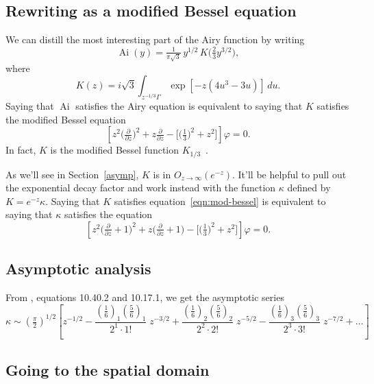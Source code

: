 \documentclass{article}
\DeclareMathOperator{\Ai}{Ai}
\begin{document}
\subsection{Rewriting as a modified Bessel equation}
We can distill the most interesting part of the Airy function by writing
\[ \Ai(y) = \tfrac{1}{\pi\sqrt{3}}\,y^{1/2}\, K\big(\tfrac{2}{3} y^{3/2}\big), \]
where
\begin{equation}\label{integral:mod-bessel}
K(z) = i\sqrt{3} \int_{z^{-1/3}\Gamma} \exp\left[-z \left(4u^3 - 3u\right)\right]\,du.
\end{equation}
Saying that $\Ai$ satisfies the Airy equation is equivalent to saying that $K$ satisfies the modified Bessel equation
\begin{equation}\label{eqn:mod-bessel}
\left[z^2 \big(\tfrac{\partial}{\partial z}\big)^2 + z \tfrac{\partial}{\partial z} - \big[\big(\tfrac{1}{3}\big)^2 + z^2\big]\right] \varphi = 0.
\end{equation}
In fact, $K$ is the modified Bessel function $K_{1/3}$~\cite[equation~9.6.1]{dlmf}.

As we'll see in Section~\ref{asymp}, $K$ is in $O_{z \to \infty}(e^{-z})$. It'll be helpful to pull out the exponential decay factor and work instead with the function $\kappa$ defined by $K = e^{-z} \kappa$. Saying that $K$ satisfies equation~\ref{eqn:mod-bessel} is equivalent to saying that $\kappa$ satisfies the equation
\begin{equation}\label{eqn:shifted-mod-bessel}
\left[z^2 \big(\tfrac{\partial}{\partial z} + 1\big)^2 + z \big(\tfrac{\partial}{\partial z} + 1\big) - \big[\big(\tfrac{1}{3}\big)^2 + z^2\big]\right] \varphi = 0.
\end{equation}
\subsection{Asymptotic analysis}
From \cite{dlmf}, equations 10.40.2 and 10.17.1, we get the asymptotic series
\begin{equation}\label{bessel-asymp}
\kappa \sim \left(\tfrac{\pi}{2}\right)^{1/2} \left[ z^{-1/2} - \frac{(\tfrac{1}{6})_1 (\tfrac{5}{6})_1}{2^1 \cdot 1!}\;z^{-3/2} + \frac{(\tfrac{1}{6})_2 (\tfrac{5}{6})_2}{2^2 \cdot 2!}\;z^{-5/2} - \frac{(\tfrac{1}{6})_3 (\tfrac{5}{6})_3}{2^3 \cdot 3!}\;z^{-7/2} + \ldots \right]
\end{equation}
\subsection{Going to the spatial domain}\label{spatial}
\end{document}
